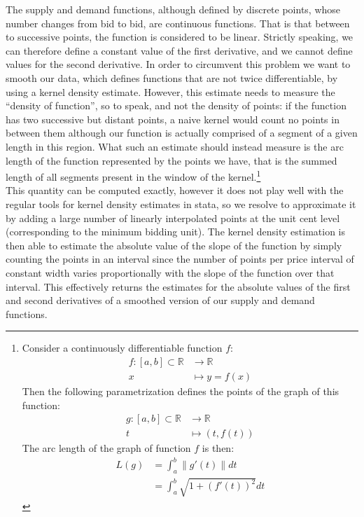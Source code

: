 \begin{subappendices}
The supply and demand functions, although defined by discrete points, whose number changes from bid to bid, are continuous functions. That is that between to successive points, the function is considered to be linear. Strictly speaking, we can therefore define a constant value of the first derivative, and we cannot define values for the second derivative. In order to circumvent this problem we want to smooth our data, which defines functions that are not twice differentiable, by using a kernel density estimate. However, this estimate needs to measure the ``density of function'', so to speak, and not the density of points: if the function has two successive but distant points, a naive kernel would count no points in between them although our function is actually comprised of a segment of a given length in this region. What such an estimate should instead measure is the arc length of the function represented by the points we have, that is the summed length of all segments present in the window of the kernel.\footnote{Consider a continuously differentiable function $f$:
\begin{align*}
f \colon [a,b] \subset \mathbb{R} &\to \mathbb{R}\\
x & \mapsto y=f(x)
\end{align*}
Then the following parametrization defines the points of the graph of this function: 
\begin{align*}
g \colon [a,b] \subset \mathbb{R} &\to \mathbb{R}\\
t & \mapsto (t, f(t))
\end{align*}
The arc length of the graph of function $f$ is then:
\begin{align*}
L(g) &= \int_a^b\lVert g'(t)\rVert dt \\
& =\int_a^b \sqrt{1+\left(f'(t)\right)^2} dt
\end{align*}
} \\

This quantity can be computed exactly, however it does not play well with the regular tools for kernel density estimates in stata, so we resolve to approximate it by adding a large number of linearly interpolated points at the unit cent level (corresponding to the minimum bidding unit). The kernel density estimation is then able to estimate the absolute value of the slope of the function by simply counting the points in an interval since the number of points per price interval of constant width varies proportionally with the slope of the function over that interval. This effectively returns the estimates for the absolute values of the first and second derivatives of a smoothed version of our supply and demand functions. 


\end{subappendices}
